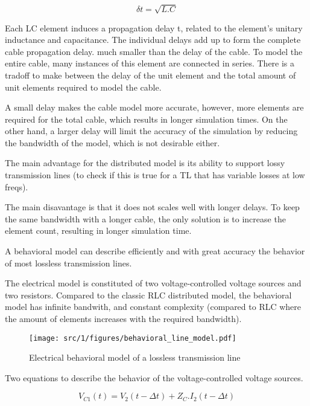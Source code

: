 \begin{equation}
\delta t = \sqrt{L.C}
\end{equation}

Each LC element induces a propagation delay \textdelta{}t, related to the element's unitary inductance and capacitance.
The individual delays add up to form the complete cable propagation delay.
much smaller than the delay of the cable.
To model the entire cable, many instances of this element are connected in series.
There is a tradoff to make between the delay of the unit element and the total amount of unit elements required to model the cable.

A small delay makes the cable model more accurate, however, more elements are required for the total cable, which results in longer simulation times.
On the other hand, a larger delay will limit the accuracy of the simulation by reducing the bandwidth of the model, which is not desirable either.

The main advantage for the distributed model is its ability to support lossy transmission lines (to check if this is true for a TL that has variable losses at low freqs).

The main disavantage is that it does not scales well with longer delays.
To keep the same bandwidth with a longer cable, the only solution is to increase the element count, resulting in longer simulation time.

A behavioral model can describe efficiently and with great accuracy the behavior of most lossless transmission lines.

The electrical model is constituted of two voltage-controlled voltage sources and two resistors.
Compared to the classic RLC distributed model, the behavioral model has infinite bandwith, and constant complexity (compared to RLC where the amount of elements increases with the required bandwidth).

\begin{figure}[!h]
  \centering
  \texttt{[image: src/1/figures/behavioral\_line\_model.pdf]}
  \caption{Electrical behavioral model of a lossless transmission line}
  \label{fig:beh-line-model}
\end{figure}

Two equations to describe the behavior of the voltage-controlled voltage sources.

\begin{equation}
V_{C1}(t) = V_{2}(t - \Delta t) + Z_{C}.I_{2}(t - \Delta t)
\end{equation}

